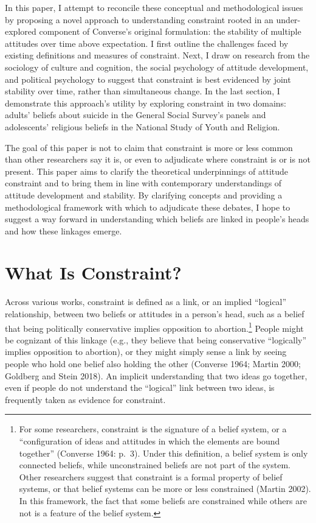 \documentclass[12pt,]{article}
\begin{document}
In this paper, I attempt to reconcile these conceptual and methodological issues by proposing a novel approach to understanding constraint rooted in an under-explored component of Converse's original formulation: the stability of multiple attitudes over time above expectation. I first outline the challenges faced by existing definitions and measures of constraint. Next, I draw on research from the sociology of culture and cognition, the social psychology of attitude development, and political psychology to suggest that constraint is best evidenced by joint stability over time, rather than simultaneous change. In the last section, I demonstrate this approach's utility by exploring constraint in two domains: adults' beliefs about suicide in the General Social Survey's panels and adolescents' religious beliefs in the National Study of Youth and Religion.

The goal of this paper is not to claim that constraint is more or less common than other researchers say it is, or even to adjudicate where constraint is or is not present. This paper aims to clarify the theoretical underpinnings of attitude constraint and to bring them in line with contemporary understandings of attitude development and stability. By clarifying concepts and providing a methodological framework with which to adjudicate these debates, I hope to suggest a way forward in understanding which beliefs are linked in people's heads and how these linkages emerge.

\hypertarget{what-is-constraint}{%
\section{What Is Constraint?}\label{what-is-constraint}}

Across various works, constraint is defined as a link, or an implied ``logical'' relationship, between two beliefs or attitudes in a person's head, such as a belief that being politically conservative implies opposition to abortion.\footnote{For some researchers, constraint is the signature of a belief system, or a ``configuration of ideas and attitudes in which the elements are bound together'' (Converse 1964: p.~3). Under this definition, a belief system is only connected beliefs, while unconstrained beliefs are not part of the system. Other researchers suggest that constraint is a formal property of belief systems, or that belief systems can be more or less constrained (Martin 2002). In this framework, the fact that some beliefs are constrained while others are not is a feature of the belief system.} People might be cognizant of this linkage (e.g., they believe that being conservative ``logically'' implies opposition to abortion), or they might simply sense a link by seeing people who hold one belief also holding the other (Converse 1964; Martin 2000; Goldberg and Stein 2018). An implicit understanding that two ideas go together, even if people do not understand the ``logical'' link between two ideas, is frequently taken as evidence for constraint.
\end{document}
